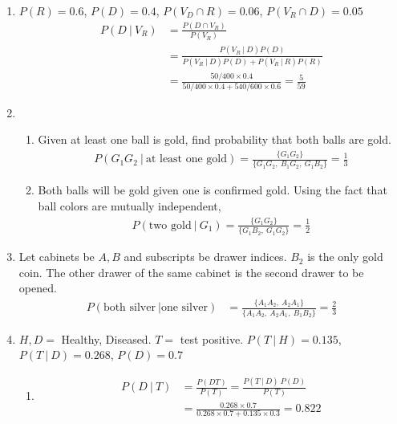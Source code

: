 \begin{enumerate}
	\item $ P(R) = 0.6 $, $ P(D) = 0.4 $, $ P(V_D \cap R) = 0.06 $, $ P(V_R \cap D) = 0.05 $ \\
	\begin{subequations}
		\begin{align}
			P(D \ |\ V_R) &= \frac{P(D \cap V_R)}{P(V_R)} \\
			&= \frac{P(V_R \ |\ D) P(D)}{P(V_R \ |\ D) P(D) + P(V_R \ |\ R) P(R)} \\
			&= \frac{50/400 \times 0.4}{50/400 \times 0.4 + 540/600 \times 0.6} = \frac{5}{59}
		\end{align}
	\end{subequations}
	
	\item \begin{enumerate}
		\item Given at least one ball is gold, find probability that both balls are gold.
		\begin{align}
			P(G_1 G_2 \ |\ \text{at least one gold}) = \frac{\{ G_1 G_2 \}}{\{ G_1 G_2,\ B_1 G_2,\ G_1 B_2 \}} = \frac{1}{3}
		\end{align}
		
		\item Both balls will be gold given one is confirmed gold. Using the fact that ball colors are mutually independent,
		\begin{align}
			P(\text{two gold}\ |\ G_1) = \frac{\{ G_1 G_2 \}}{\{ G_1 B_2 ,\ G_1 G_2\}} = \frac{1}{2}
		\end{align}
	\end{enumerate}
	
	\item Let cabinets be $ A, B $ and subscripts be drawer indices. $ B_2 $ is the only gold coin. The other drawer of the same cabinet is the second drawer to be opened.
	\begin{align}
		P(\text{both silver}\ | \text{one silver}) &= \frac{\{ A_1 A_2,\ A_2 A_1 \}}{\{ A_1 A_2,\ A_2 A_1,\ B_1 B_2 \}} = \frac{2}{3}
	\end{align}
	
	\item $ H, D = $ Healthy, Diseased. $ T =  $ test positive.
	$ P(T\ |\ H) = 0.135 $, $ P(T\ |\ D) = 0.268 $, $ P(D) = 0.7 $\\
	
	\begin{enumerate}
		\item \begin{align}
			P(D\ |\ T) &= \frac{P(DT)}{P(T)} = \frac{P(T\ |\ D) \ P(D)}{P(T)} \\
			&= \frac{0.268 \times 0.7}{0.268 \times 0.7 + 0.135 \times 0.3} = 0.822
		\end{align}
		

\end{enumerate}
\end{enumerate}
